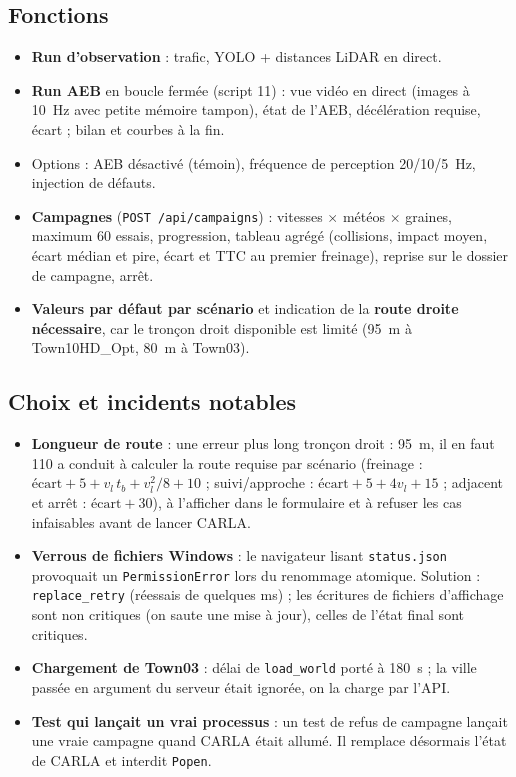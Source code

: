 \documentclass[11pt,a4paper]{article}
\providecommand{\og}{\guillemotleft\nobreakspace}
\providecommand{\fg}{\nobreakspace\guillemotright}
\newcommand{\code}[1]{\texttt{#1}}
\begin{document}
\subsection{Fonctions}
\begin{itemize}
\item \textbf{Run d'observation} : trafic, YOLO + distances LiDAR en direct.
\item \textbf{Run AEB} en boucle ferm\'ee (script 11) : vue vid\'eo en direct (images \`a 10~Hz avec petite m\'emoire tampon), \'etat de l'AEB, d\'ec\'el\'eration requise, \'ecart ; bilan et courbes \`a la fin.
\item Options : AEB d\'esactiv\'e (t\'emoin), fr\'equence de perception 20/10/5~Hz, injection de d\'efauts.
\item \textbf{Campagnes} (\code{POST /api/campaigns}) : vitesses $\times$ m\'et\'eos $\times$ graines, maximum 60 essais, progression, tableau agr\'eg\'e (collisions, impact moyen, \'ecart m\'edian et pire, \'ecart et TTC au premier freinage),
      reprise sur le dossier de campagne, arr\^et.
\item \textbf{Valeurs par d\'efaut par sc\'enario} et indication de la \textbf{route droite n\'ecessaire}, car le tron\c con droit disponible est limit\'e (95~m \`a Town10HD\_Opt, 80~m \`a Town03).
\end{itemize}

\subsection{Choix et incidents notables}
\begin{itemize}
\item \textbf{Longueur de route} : une erreur \og plus long tron\c con droit : 95~m, il en faut 110 \fg{} a conduit \`a calculer la route requise par sc\'enario
      (freinage : $\text{\'ecart}+5+v_l\,t_b+v_l^2/8+10$ ; suivi/approche : $\text{\'ecart}+5+4v_l+15$ ; adjacent et arr\^et : $\text{\'ecart}+30$), \`a l'afficher dans le formulaire et \`a refuser les cas infaisables avant de lancer CARLA.
\item \textbf{Verrous de fichiers Windows} : le navigateur lisant \code{status.json} provoquait un \code{PermissionError} lors du renommage atomique. Solution : \code{replace\_retry} (r\'eessais de quelques ms) ;
      les \'ecritures de fichiers d'affichage sont non critiques (on saute une mise \`a jour), celles de l'\'etat final sont critiques.
\item \textbf{Chargement de Town03} : d\'elai de \code{load\_world} port\'e \`a 180~s ; la ville pass\'ee en argument du serveur \'etait ignor\'ee, on la charge par l'API.
\item \textbf{Test qui lan\c cait un vrai processus} : un test de refus de campagne lan\c cait une vraie campagne quand CARLA \'etait allum\'e. Il remplace d\'esormais l'\'etat de CARLA et interdit \code{Popen}.
\end{itemize}
\end{document}
